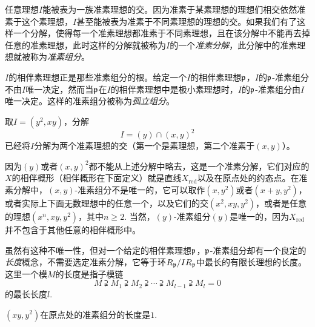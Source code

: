 任意理想$I$能被表为一族准素理想的交。因为准素于某素理想的理想们相交依然准素于这个素理想，$I$甚至能被表为准素于不同素理想的理想的交。如果我们有了这样一个分解，使得每一个准素理想都准素于不同素理想，且在该分解中不能再去掉任意的准素理想，此时这样的分解就被称为$I$的一个\textit{准素分解}，此分解中的准素理想就被称为\textit{准素组分}。

$I$的相伴素理想正是那些准素组分的根。给定一个$I$的相伴素理想$\mathfrak{p}$，$I$的$\mathfrak{p}$-准素组分不由$I$唯一决定，然而当$\mathfrak{p}$在$I$的相伴素理想中是极小素理想时，$I$的$\mathfrak{p}$-准素组分由$I$唯一决定。这样的准素组分被称为\textit{孤立组分}。

\begin{exe}
	取$I=(y^2,xy)$，分解
	\[
	I=(y)\cap (x,y)^2
	\]
	已经将$I$分解为两个准素理想的交（第一个是素理想，第二个准素于$(x,y)$）。
\end{exe}

因为$(y)$或者$(x,y)^2$都不能从上述分解中略去，这是一个准素分解，它们对应的$X$的相伴概形（相伴概形在下面定义）就是直线$X_{\mathrm{red}}$以及在原点处的约态点。在准素分解中，$(x,y)$\hyp 准素组分不是唯一的，它可以取作$(x,y^2)$或者$(x+y,y^2)$，或者实际上下面无数理想中的任意一个，以及它们的交$(x^2,xy,y^2)$，或者是任意的理想$(x^n,xy,y^2)$，其中$n\geq 2$. 当然，$(y)$\hyp 准素组分$(y)$是唯一的，因为$X_{\mathrm{red}}$并不包含于其他任意的相伴概形中。

虽然有这种不唯一性，但对一个给定的相伴素理想$\mathfrak{p}$，$\mathfrak{p}$-准素组分却有一个良定的\textit{长度}概念，不需要选定准素分解，它等于环$R_{\mathfrak{p}}/IR_{\mathfrak{p}}$中最长的有限长理想的长度。这里一个模$M$的长度是指子模链
\[
	M\supsetneqq M_1 \supsetneqq M_2 \supsetneqq \cdots \supsetneqq M_{l-1} \supsetneqq M_l=0
\]
的最长长度$l$.

\begin{exe}
	$(xy,y^2)$在原点处的准素组分的长度是$1$.
\end{exe}

